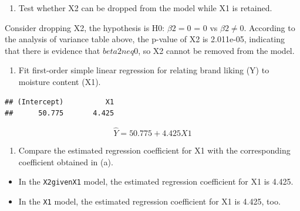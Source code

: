 \documentclass[
]{article}
\newenvironment{Shaded}{\begin{snugshade}}{\end{snugshade}}
\newcommand{\DecValTok}[1]{\textcolor[rgb]{0.00,0.00,0.81}{#1}}
\newcommand{\KeywordTok}[1]{\textcolor[rgb]{0.13,0.29,0.53}{\textbf{#1}}}
\newcommand{\NormalTok}[1]{#1}
\newcommand{\OperatorTok}[1]{\textcolor[rgb]{0.81,0.36,0.00}{\textbf{#1}}}
\providecommand{\tightlist}{%
  \setlength{\itemsep}{0pt}\setlength{\parskip}{0pt}}
\begin{document}
\begin{enumerate}
\def\labelenumi{(\alph{enumi})}
\setcounter{enumi}{1}
\tightlist
\item
  Test whether X2 can be dropped from the model while X1 is retained.
\end{enumerate}

Consider dropping X2, the hypothesis is H0: \(\beta2 = 0\) = 0 vs
\(\beta2 \neq 0\). According to the analysis of variance table above,
the p-value of X2 is 2.011e-05, indicating that there is evidence that
\(beta2 neq 0\), so X2 cannot be removed from the model.

\begin{enumerate}
\def\labelenumi{(\alph{enumi})}
\setcounter{enumi}{2}
\tightlist
\item
  Fit first-order simple linear regression for relating brand liking (Y)
  to moisture content (X1).
\end{enumerate}

\begin{Shaded}
\end{Shaded}

\begin{verbatim}
## (Intercept)          X1 
##      50.775       4.425
\end{verbatim}

\[
\hat{Y} = 50.775 + 4.425X1
\]

\begin{enumerate}
\def\labelenumi{(\alph{enumi})}
\setcounter{enumi}{3}
\tightlist
\item
  Compare the estimated regression coefficient for X1 with the
  corresponding coefficient obtained in (a).
\end{enumerate}

\begin{itemize}
\tightlist
\item
  In the \texttt{X2givenX1} model, the estimated regression coefficient
  for X1 is 4.425.
\item
  In the \texttt{X1} model, the estimated regression coefficient for X1
  is 4.425, too.
\end{itemize}

\begin{Shaded}
\end{Shaded}
\end{document}
